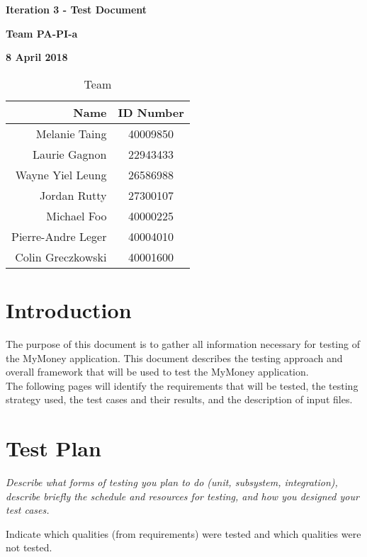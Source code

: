 \documentclass[12pt]{article}
\begin{document}
\vspace*{0.5in}
\centerline{\bf\Large Iteration 3 - Test Document}

\vspace*{0.5in}
\centerline{\bf\Large Team PA-PI-a}

\vspace*{0.5in}
\centerline{\bf\Large 8 April 2018}

\vspace*{1.5in}
\begin{table}[htbp]
\caption{Team}
\begin{center}
\begin{tabular}{|r | c|}
\hline
Name & ID Number \\
\hline\hline
Melanie Taing & 40009850 \\
Laurie Gagnon & 22943433 \\
Wayne Yiel Leung & 26586988 \\
Jordan Rutty & 27300107 \\
Michael Foo & 40000225 \\
Pierre-Andre Leger & 40004010 \\
Colin Greczkowski & 40001600 \\
\hline
\end{tabular}
\end{center}
\end{table}

\clearpage

\tableofcontents
\clearpage

\section{Introduction}
The purpose of this document is to gather all information necessary for testing of the MyMoney application. This document describes the testing approach and overall framework that will be used to test the MyMoney application.\\

The following pages will identify the requirements that will be tested, the testing strategy used, the test cases and their results, and the description of input files.

\section{Test Plan}

{\it
Describe what forms of testing you plan to do (unit, subsystem, integration),
describe briefly the schedule and resources for testing,
and
how you designed your test cases.

Indicate which qualities (from requirements) were tested and which qualities were not tested.
}
\end{document}
